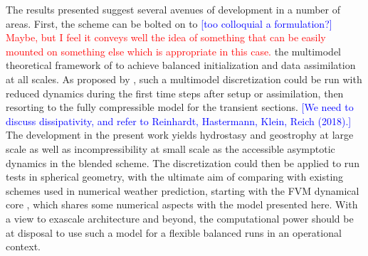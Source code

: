 \documentclass{ametsoc}
\theoremstyle{definition}
\newcommand{\klein}[1]{\textcolor{blue}{#1}}
\newcommand{\benacchio}[1]{\textcolor{red}{#1}}
\begin{document}
The results presented suggest several avenues of development in a number of areas. First, the scheme can be bolted on to \klein{[too colloquial a formulation?]} \benacchio{Maybe, but I feel it conveys well the idea of something that can be easily mounted on something else which is appropriate in this case.} the multimodel theoretical framework of \cite{KleinBenacchio2016} to achieve balanced initialization and data assimilation at all scales. As proposed by \cite{BenacchioEtAl2014}, such a multimodel discretization could be run with reduced dynamics during the first time steps after setup or assimilation, then resorting to the fully compressible model for the transient sections. \klein{[We need to discuss dissipativity, and refer to Reinhardt, Hastermann, Klein, Reich (2018).]} The development in the present work yields hydrostasy and geostrophy at large scale as well as incompressibility at small scale as the accessible asymptotic dynamics in the blended scheme. The discretization could then be applied to run tests in spherical geometry, with the ultimate aim of comparing with existing schemes used in numerical weather prediction, starting with the FVM dynamical core \citep{KuehnleinEtAl2018}, which shares some numerical aspects with the model presented here. With a view to exascale architecture and beyond, the computational power should be at disposal to use such a model for a flexible balanced runs in an operational context.
\end{document}
